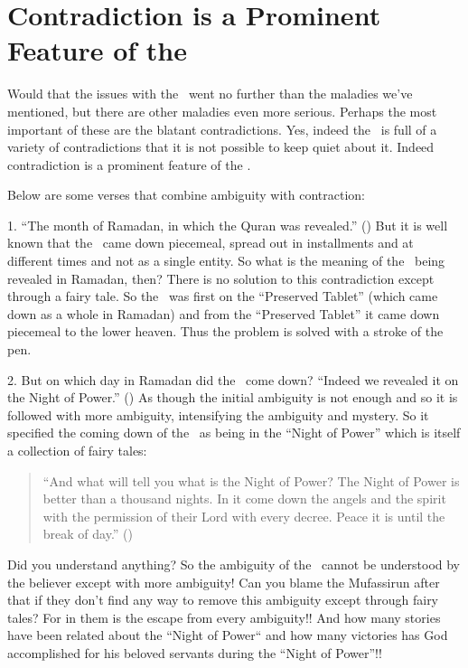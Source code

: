\documentclass[12pt]{memoir}
\renewcommand\pardivider{\centerline{\ar{۞۞۞}}}
\begin{document}

\pardivider

\section{Contradiction is a Prominent Feature of the \Quran}

Would that the issues with the \Quran\ went no further
than the maladies we’ve mentioned,
but there are other maladies even more serious.
Perhaps the most important of these are the blatant contradictions.
Yes, indeed the \Quran\ is full of a variety of contradictions
that it is not possible to keep quiet about it.
Indeed contradiction is a prominent feature of the \Quran.

Below are some verses that combine ambiguity with contraction:

1. “The month of Ramadan, in which the Quran was revealed.” ()
But it is well known that the \Quran\ came down piecemeal,
spread out in installments and at different times and not as a single entity.
So what is the meaning of the \Quran\ being revealed in Ramadan, then?
There is no solution to this contradiction except through a fairy tale.
So the \Quran\ was first on the “Preserved Tablet”
(which came down as a whole in Ramadan)
and from the “Preserved Tablet” it came down piecemeal to the lower heaven.
Thus the problem is solved with a stroke of the pen.

2. But on which day in Ramadan did the \Quran\ come down?
“Indeed we revealed it on the Night of Power.” ()
As though the initial ambiguity is not enough
and so it is followed with more ambiguity,
intensifying the ambiguity and mystery.
So it specified the coming down of the \Quran\
as being in the “Night of Power” which is itself a collection of fairy tales:

\begin{quote}
“And what will tell you what is the Night of Power?
The Night of Power is better than a thousand nights.
In it come down the angels and the spirit
with the permission of their Lord with every decree.
Peace it is until the break of day.” ()
\end{quote}

Did you understand anything?
So the ambiguity of the \Quran\ cannot be understood by the believer
except with more ambiguity!
Can you blame the Mufassirun after that if they don’t find any way
to remove this ambiguity except through fairy tales?
For in them is the escape from every ambiguity!!
And how many stories have been related about the “Night of Power“
and how many victories has God accomplished
for his beloved servants during the “Night of Power”!!
\end{document}
